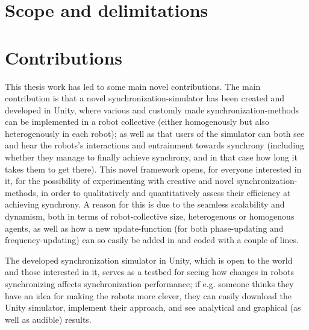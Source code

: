 \section{Scope and delimitations}










\section{Contributions}






This thesis work has led to some main novel contributions. The main contribution is that a novel synchronization-simulator has been created and developed in Unity, where various and customly made synchronization-methods can be implemented in a robot collective (either homogenously but also heterogenously in each robot); as well as that users of the simulator can both see and hear the robots's interactions and entrainment towards synchrony (including whether they manage to finally achieve synchrony, and in that case how long it takes them to get there). This novel framework opens, for everyone interested in it, for the possibility of experimenting with creative and novel synchronization-methods, in order to qualitatively and quantitatively assess their efficiency at achieving synchrony. A reason for this is due to the seamless scalability and dynamism, both in terms of robot-collective size, heterogenous or homogenous agents, as well as how a new update-function (for both phase-updating and frequency-updating) can so easily be added in and coded with a couple of lines.

The developed synchronization simulator in Unity, which is open to the world and those interested in it, serves as a testbed for seeing how changes in robots synchronizing affects synchronization performance; if e.g. someone thinks they have an idea for making the robots more clever, they can easily download the Unity simulator, implement their approach, and see analytical and graphical (as well as audible) results.

